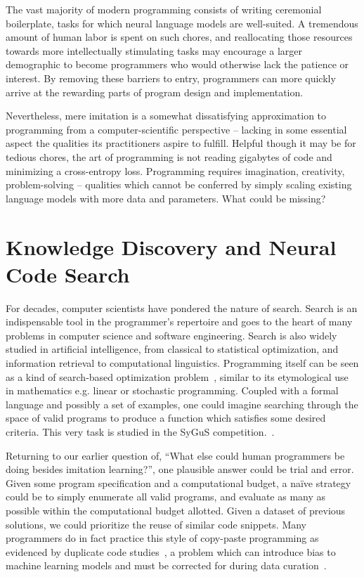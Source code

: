 \documentclass[10pt]{article}
\begin{document}
The vast majority of modern programming consists of writing ceremonial boilerplate, tasks for which neural language models are well-suited. A tremendous amount of human labor is spent on such chores, and reallocating those resources towards more intellectually stimulating tasks may encourage a larger demographic to become programmers who would otherwise lack the patience or interest. By removing these barriers to entry, programmers can more quickly arrive at the rewarding parts of program design and implementation.

Nevertheless, mere imitation is a somewhat dissatisfying approximation to programming from a computer-scientific perspective -- lacking in some essential aspect the qualities its practitioners aspire to fulfill. Helpful though it may be for tedious chores, the art of programming is not reading gigabytes of code and minimizing a cross-entropy loss. Programming requires imagination, creativity, problem-solving -- qualities which cannot be conferred by simply scaling existing language models with more data and parameters. What could be missing?

\section{Knowledge Discovery and Neural Code Search}

For decades, computer scientists have pondered the nature of search. Search is an indispensable tool in the programmer's repertoire and goes to the heart of many problems in computer science and software engineering. Search is also widely studied in artificial intelligence, from classical to statistical optimization, and information retrieval to computational linguistics. Programming itself can be seen as a kind of search-based optimization problem~\cite{alur2018search}, similar to its etymological use in mathematics e.g. linear or stochastic programming. Coupled with a formal language and possibly a set of examples, one could imagine searching through the space of valid programs to produce a function which satisfies some desired criteria. This very task is studied in the SyGuS competition.~\cite{alur2016sygus}.

Returning to our earlier question of, ``What else could human programmers be doing besides imitation learning?'', one plausible answer could be trial and error. Given some program specification and a computational budget, a naïve strategy could be to simply enumerate all valid programs, and evaluate as many as possible within the computational budget allotted. Given a dataset of previous solutions, we could prioritize the reuse of similar code snippets. Many programmers do in fact practice this style of copy-paste programming as evidenced by duplicate code studies~\cite{lopes2017dejavu}, a problem which can introduce bias to machine learning models and must be corrected for during data curation~\cite{allamanis2019adverse}.
\end{document}
